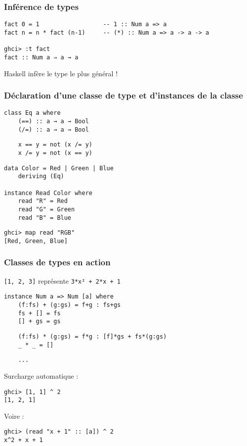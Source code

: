 \documentclass[10pt]{beamer}
\begin{document}
\begin{frame}[fragile]
\frametitle{Inférence de types}

\begin{verbatim}
fact 0 = 1                  -- 1 :: Num a => a
fact n = n * fact (n-1)     -- (*) :: Num a => a -> a -> a

ghci> :t fact
fact :: Num a ⇒ a → a
\end{verbatim}

Haskell infère le type le plus général !
\end{frame}



\begin{frame}[fragile]
\frametitle{Déclaration d'une classe de type et d'instances de la classe}
\begin{verbatim}
class Eq a where
    (==) :: a → a → Bool
    (/=) :: a → a → Bool
\end{verbatim}
\pause
\begin{verbatim}
    x == y = not (x /= y)
    x /= y = not (x == y)
\end{verbatim}
\pause
\begin{verbatim}
data Color = Red | Green | Blue
    deriving (Eq)

instance Read Color where
    read "R" = Red
    read "G" = Green
    read "B" = Blue
\end{verbatim}
\pause
\begin{verbatim}
ghci> map read "RGB"
[Red, Green, Blue]
\end{verbatim}
\end{frame}




\begin{frame}[fragile]
\frametitle{Classes de types en action}

\verb|[1, 2, 3]| représente \verb|3*x² + 2*x + 1|

\begin{verbatim}
instance Num a => Num [a] where
    (f:fs) + (g:gs) = f+g : fs+gs
    fs + [] = fs
    [] + gs = gs
\end{verbatim}
\pause
\begin{verbatim}
    (f:fs) * (g:gs) = f*g : [f]*gs + fs*(g:gs)
    _ * _ = []
\end{verbatim}
\pause
\begin{verbatim}
    ...
\end{verbatim}

Surcharge automatique :

\begin{verbatim}
ghci> [1, 1] ^ 2
[1, 2, 1]
\end{verbatim}

\pause

Voire :

\begin{verbatim}
ghci> (read "x + 1" :: [a]) ^ 2
x^2 + x + 1
\end{verbatim}

\end{frame}
\end{document}
